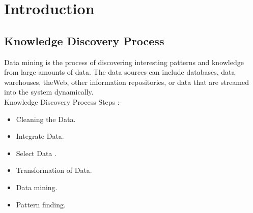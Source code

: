 
\chapter{Introduction}

\section{Knowledge Discovery Process}

Data mining is the process of discovering interesting patterns and
knowledge from large amounts of data. The data sources can include databases, data
warehouses, theWeb, other information repositories, or data that are streamed into the
system dynamically.\\

Knowledge Discovery Process Steps \cite{k1} :-
\begin{itemize}

\item {Cleaning the Data.}
\item{Integrate Data.}
\item{Select Data .}
\item{Transformation of Data.}
\item{Data mining.}
\item{Pattern finding.}

\end{itemize}

